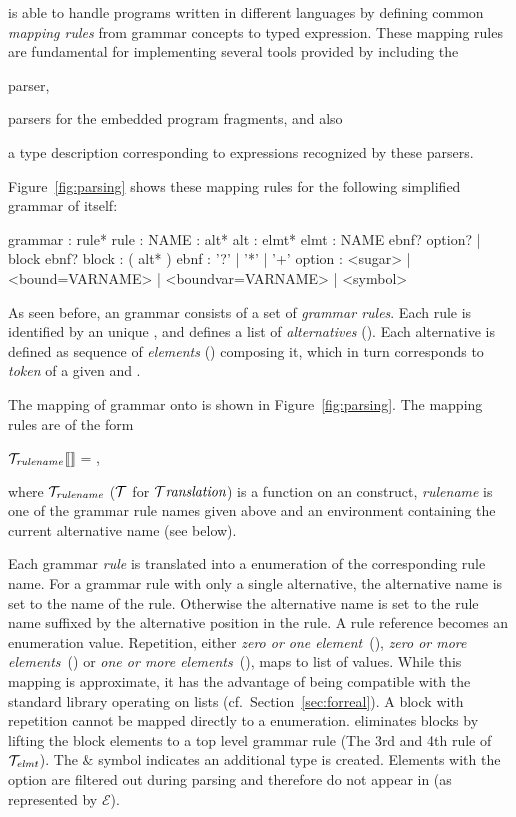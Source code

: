 \Tosca is able to handle programs written in different languages by defining common \emph{mapping rules}
from \antlr grammar concepts to \Tosca typed expression.
These mapping rules are fundamental for implementing several tools 
provided by \Tosca including the
\begin{enumerate*} [label=\itshape(\roman*)]
  \item \Tosca parser,
  \item parsers for the embedded program fragments, and also
  \item a \Tosca type description corresponding to \Tosca
    expressions recognized by these parsers.
\end{enumerate*}
%
Figure~\ref{fig:parsing} shows these mapping rules for the following
simplified grammar of \antlr itself:
%
\begin{lstANTLR}
  grammar     : rule* 
  rule        : NAME : alt* 
  alt         : elmt*
  elmt        : NAME ebnf? option? | block ebnf?
  block       : ( alt* ) 
  ebnf        : '?' | '*' | '+'
  option      : <sugar> | <bound=VARNAME> 
              | <boundvar=VARNAME> | <symbol>   
\end{lstANTLR}

As seen before, an \antlr grammar consists of a set of \emph{grammar rules}. Each
rule is identified by an unique , and defines a list of \emph{alternatives} ().
Each alternative is defined as sequence of \emph{elements} () composing it, which in turn
corresponds to \emph{token} of a given  and .  

The mapping of \antlr grammar onto \Tosca is shown in Figure~\ref{fig:parsing}. The mapping rules are 
of the form 
\begin{center}
  $\mathcal{T}_{\mathit{rulename}}$⟦\antlr⟧ =  ,
\end{center}
 where $\mathcal{T}_{\mathit{rulename}}$ ($\mathcal{T}$ for $\mathcal{T}\textit{ranslation}$) is a function on an \antlr construct, 
\emph{rulename} is one of the \antlr grammar rule names given above and  an environment containing the current 
alternative name (see below).  

Each grammar \emph{rule} is translated into a \Tosca enumeration of the corresponding 
rule name. For a grammar rule with only a single alternative, the alternative name is set to the name
of the rule. Otherwise the alternative name is set to the rule name suffixed by the alternative position in the rule.
A rule reference becomes an enumeration value. Repetition, either \emph{zero or one element}~(), \emph{zero or more elements}~() 
or \emph{one or more elements}~(), maps to list of values. While this mapping is approximate, it has the advantage of being compatible with the 
\Tosca standard library operating on lists (cf.~Section~\ref{sec:forreal}). 
A block with repetition cannot be mapped directly to a \Tosca enumeration. \Tosca eliminates blocks
by lifting the block elements to a top level grammar rule 
(The 3rd and 4th rule of $\mathcal{T}_{\mathit{elmt}}$). The $\&$ symbol indicates an additional type is created. Elements with the option 
are filtered out during parsing and therefore do not appear in \Tosca (as represented by $\mathcal{E}$).    

